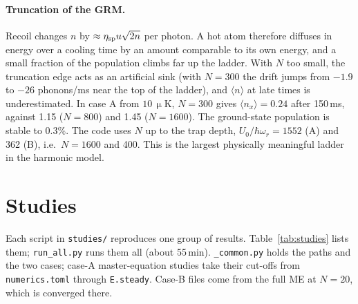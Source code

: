 \documentclass[11pt,a4paper]{article}
\newcommand{\code}[1]{\texttt{#1}}
\newcommand{\SI}[2]{\ensuremath{#1\,\mathrm{#2}}}
\begin{document}
\paragraph{Truncation of the GRM.} Recoil changes $n$ by $\approx\eta_{\rm sp}u\sqrt{2n}$ per photon. A hot atom therefore diffuses in energy over a cooling time by an amount comparable to its own energy, and a small fraction of the population climbs far up the ladder. With $N$ too small, the truncation edge acts as an artificial sink (with $N=300$ the drift jumps from $-1.9$ to $-26$ phonons/ms near the top of the ladder), and $\langle n\rangle$ at late times is underestimated. In case A from \SI{10}{\upmu K}, $N=300$ gives $\langle n_x\rangle=0.24$ after 150\,ms, against 1.15 ($N=800$) and 1.45 ($N=1600$). The ground-state population is stable to 0.3\%. The code uses $N$ up to the trap depth, $U_0/\hbar\omega_r=1552$ (A) and 362 (B), i.e.\ $N=1600$ and 400. This is the largest physically meaningful ladder in the harmonic model.

\section{Studies}
\label{sec:studies}
Each script in \code{studies/} reproduces one group of results. Table~\ref{tab:studies} lists them; \code{run\_all.py} runs them all (about 55\,min). \code{\_common.py} holds the paths and the two cases; case-A master-equation studies take their cut-offs from \code{numerics.toml} through \code{E.steady}. Case-B files come from the full ME at $N=20$, which is converged there.
\end{document}
